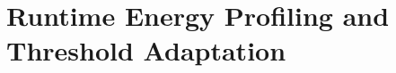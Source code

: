 \chapter{Runtime Energy Profiling and Threshold Adaptation}

\newcommand{\nn}{\textsc{Optic}}    %
\newcommand{\debs}{\textsc{Debs}}
\newcommand{\symb}[2]{#1_{\text{#2}}}










